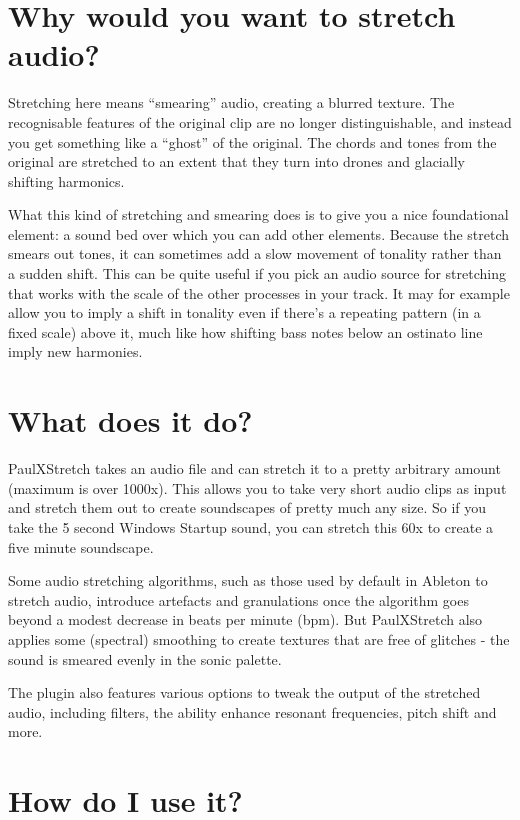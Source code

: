 \documentclass[
  12pt,
  letterpaper,
  oneside,
  open=any]{scrbook}
\begin{document}
\section{Why would you want to stretch
audio?}\label{why-would-you-want-to-stretch-audio}

Stretching here means ``smearing'' audio, creating a blurred texture.
The recognisable features of the original clip are no longer
distinguishable, and instead you get something like a ``ghost'' of the
original. The chords and tones from the original are stretched to an
extent that they turn into drones and glacially shifting harmonics.

What this kind of stretching and smearing does is to give you a nice
foundational element: a sound bed over which you can add other elements.
Because the stretch smears out tones, it can sometimes add a slow
movement of tonality rather than a sudden shift. This can be quite
useful if you pick an audio source for stretching that works with the
scale of the other processes in your track. It may for example allow you
to imply a shift in tonality even if there's a repeating pattern (in a
fixed scale) above it, much like how shifting bass notes below an
ostinato line imply new harmonies.

\section{What does it do?}\label{what-does-it-do}

PaulXStretch takes an audio file and can stretch it to a pretty
arbitrary amount (maximum is over 1000x). This allows you to take very
short audio clips as input and stretch them out to create soundscapes of
pretty much any size. So if you take the 5 second Windows Startup sound,
you can stretch this 60x to create a five minute soundscape.

Some audio stretching algorithms, such as those used by default in
Ableton to stretch audio, introduce artefacts and granulations once the
algorithm goes beyond a modest decrease in beats per minute (bpm). But
PaulXStretch also applies some (spectral) smoothing to create textures
that are free of glitches - the sound is smeared evenly in the sonic
palette.

The plugin also features various options to tweak the output of the
stretched audio, including filters, the ability enhance resonant
frequencies, pitch shift and more.

\section{How do I use it?}\label{how-do-i-use-it}
\end{document}
